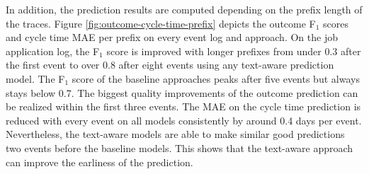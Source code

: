 In addition, the prediction results are computed depending on the prefix length of the traces.
Figure \ref{fig:outcome-cycle-time-prefix} depicts the outcome F$_1$ scores and cycle time MAE per prefix on every event log and approach.
On the job application log, the F$_1$ score is improved with longer prefixes from under 0.3 after the first event to over 0.8 after eight events using any text-aware prediction model.
The F$_1$ score of the baseline approaches peaks after five events but always stays below 0.7.
The biggest quality improvements of the outcome prediction can be realized within the first three events.
The MAE on the cycle time prediction is reduced with every event on all models consistently by around 0.4 days per event.
Nevertheless, the text-aware models are able to make similar good predictions two events before the baseline models.
This shows that the text-aware approach can improve the earliness of the prediction.

